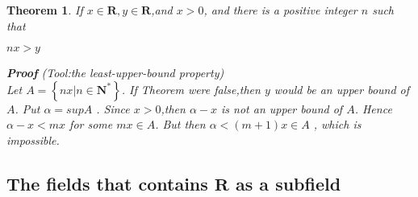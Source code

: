 \documentclass{report}
\newtheorem{mytho}{Theorem}
\begin{document}
                
                \begin{mytho}
                    If $x\in\mathbf{R},y\in\mathbf{R}$,and $x>0$,
                    and there is a positive integer $n$ such that\\
                    \begin{center}
                        $nx>y$
                    \end{center}
                    \begin{flushleft}
                        \textbf{Proof} (Tool:the least-upper-bound property)\\
                        Let $A=\left\{ nx|n\in\mathbf{N}^{*} \right\}$.
                        If Theorem were false,then $y$ would be an upper bound of $A$.
                        Put $\alpha=sup A$ . Since $x>0$,then $\alpha-x$ is not an upper bound of $A$.
                        Hence $\alpha-x<mx$ for some $mx\in A$.
                        But then $\alpha<(m+1)x\in A$ , which is impossible.
                    \end{flushleft}
                \end{mytho}
            \subsection{The fields that contains $\mathbf{R}$ as a subfield}
\end{document}
